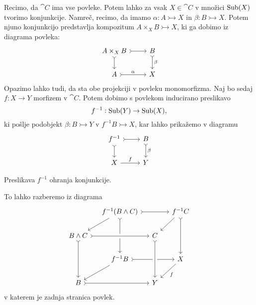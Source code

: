 \documentclass[../kategoricna_logika.tex]{subfiles}
\begin{document}
Recimo, da $\cat{C}$ ima vse povleke. 
Potem lahko za vsak $X \in \cat{C}$ v množici $\operatorname{Sub}(X)$ tvorimo konjunkcije.
Namreč, recimo, da imamo $\alpha : A \rightarrowtail X$ in $\beta : B \rightarrowtail X$.
Potem njuno konjunkcijo predstavlja kompozitum $A \times_X B \rightarrowtail X$,
ki ga dobimo iz diagrama povleka:
\begin{equation*}
    \begin{tikzcd}
        A \times_X B \ar[r, tail] \ar[d, tail] & B \ar[d, tail, "\beta"] \\
        A \ar[r, tail, "\alpha"] & X
    \end{tikzcd}
\end{equation*}
Opazimo lahko tudi, da sta obe projekciji v povleku monomorfizma.
Naj bo sedaj $f : X \to Y$ morfizem v $\cat{C}$.
Potem dobimo s povlekom inducirano preslikavo
$$f^{-1} : \operatorname{Sub}(Y) \to \operatorname{Sub}(X),$$
ki pošlje podobjekt $\beta : B \rightarrowtail Y$ v $f^{-1}B \rightarrowtail X$,
kar lahko prikažemo v diagramu
\begin{equation*}
    \begin{tikzcd}
        f^{-1} \ar[r, tail] \ar[d, tail] & B \ar[d, tail, "\beta"] \\
        X \ar[r, "f"] & Y
    \end{tikzcd}
\end{equation*}
\begin{lema}
  Preslikava $f^{-1}$ ohranja konjunkcije.
\end{lema}
\begin{dokaz}
  To lahko razberemo iz diagrama
  \begin{equation*}
  \begin{tikzcd}[column sep=small, row sep=normal]
    & f^{-1}(B \land C) \ar[dl] \ar[dd, tail] \ar[rr, tail] & & f^{-1}C \ar[dl] \ar[dd, tail] \\
    B \land C \ar[dd, tail] \ar[rr, crossing over, tail] & & C  & \\
    & f^{-1}B \ar[dl] \ar[rr, tail] & & X \ar[dl, "f"] \\
    B \ar[rr, tail] & & Y \ar[from=uu, crossing over, tail] & 
  \end{tikzcd}
  \end{equation*}
  v katerem je zadnja stranica povlek.
\end{dokaz}
\end{document}
